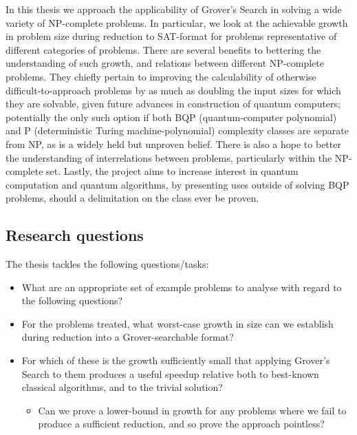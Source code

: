 \documentclass[msc,lith,english]{liuthesis}
\begin{document}
In this thesis we approach the applicability of Grover's Search in solving a wide variety of NP-complete problems. In particular, we look at the achievable growth in problem size during reduction to SAT-format for problems representative of different categories of problems. There are several benefits to bettering the understanding of such growth, and relations between different NP-complete problems. They chiefly pertain to improving the calculability of otherwise difficult-to-approach problems by as much as doubling the input sizes for which they are solvable, given future advances in construction of quantum computers; potentially the only such option if both BQP (quantum-computer polynomial) and P (deterministic Turing machine-polynomial) complexity classes are separate from NP, as is a widely held but unproven belief. There is also a hope to better the understanding of interrelations between problems, particularly within the NP-complete set. Lastly, the project aims to increase interest in quantum computation and quantum algorithms, by presenting uses outside of solving BQP problems, should a delimitation on the class ever be proven.

\subsection{Research questions}
The thesis tackles the following questions/tasks:
\begin{itemize}
    \item What are an appropriate set of example problems to analyse with regard to the following questions?
    \item For the problems treated, what worst-case growth in size can we establish during reduction into a Grover-searchable format?
    \item For which of these is the growth sufficiently small that applying Grover's Search to them produces a useful speedup relative both to best-known classical algorithms, and to the trivial solution?
    \begin{itemize}
        \item Can we prove a lower-bound in growth for any problems where we fail to produce a sufficient reduction, and so prove the approach pointless?
    \end{itemize}
\end{itemize}
\end{document}
